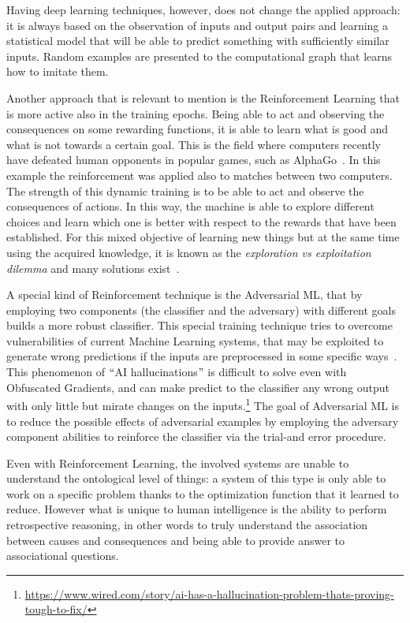 Having deep learning techniques, however, does not change the applied approach: it is always based on the observation of inputs and output pairs and learning a statistical model that will be able to predict something with sufficiently similar inputs. Random examples are presented to the computational graph that learns how to imitate them.

Another approach that is relevant to mention is the Reinforcement Learning that is more active also in the training epochs. Being able to act and observing the consequences on some rewarding functions, it is able to learn what is good and what is not towards a certain goal. This is the field where computers recently have defeated human opponents in popular games, such as AlphaGo~\cite{chouard2016go}. In this example the reinforcement was applied also to matches between two computers. The strength of this dynamic training is to be able to act and observe the consequences of actions. In this way, the machine is able to explore different choices and learn which one is better with respect to the rewards that have been established. For this mixed objective of learning new things but at the same time using the acquired knowledge, it is known as the \textit{exploration vs exploitation dilemma} and many solutions exist~\cite{tokic2010adaptive}.

A special kind of Reinforcement technique is the Adversarial ML, that by employing two components (the classifier and the adversary) with different goals builds a more robust classifier. This special training technique tries to overcome vulnerabilities of current Machine Learning systems, that may be exploited to generate wrong predictions if the inputs are preprocessed in some specific ways~\cite{athalye2018obfuscated}. This phenomenon of $``$AI hallucinations$"$  is difficult to solve even with Obfuscated Gradients, and can make predict to the classifier any wrong output with only little but mirate changes on the inputs.\footnote{\url{https://www.wired.com/story/ai-has-a-hallucination-problem-thats-proving-tough-to-fix/}} The goal of Adversarial ML is to reduce the possible effects of adversarial examples by employing the adversary component abilities to reinforce the classifier via the trial-and error procedure.

Even with Reinforcement Learning, the involved systems are unable to understand the ontological level of things: a system of this type is only able to work on a specific problem thanks to the optimization function that it learned to reduce. However what is unique to human intelligence is the ability to perform retrospective reasoning, in other words to truly understand the association between causes and consequences and being able to provide answer to associational questions.

